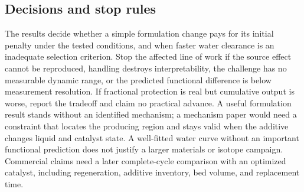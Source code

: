 \subsection{Decisions and stop rules}

The results decide whether a simple formulation change pays for its initial penalty under the tested conditions, and when faster water clearance is an inadequate selection criterion. Stop the affected line of work if the source effect cannot be reproduced, handling destroys interpretability, the challenge has no measurable dynamic range, or the predicted functional difference is below measurement resolution. If fractional protection is real but cumulative output is worse, report the tradeoff and claim no practical advance. A useful formulation result stands without an identified mechanism; a mechanism paper would need a constraint that locates the producing region and stays valid when the additive changes liquid and catalyst state. A well-fitted water curve without an important functional prediction does not justify a larger materials or isotope campaign. Commercial claims need a later complete-cycle comparison with an optimized catalyst, including regeneration, additive inventory, bed volume, and replacement time.
